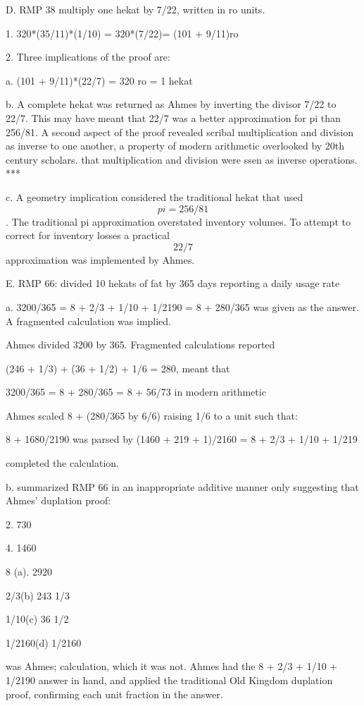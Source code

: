 \documentclass[12pt]{article}
\begin{document}
D. RMP 38 multiply one hekat by 7/22, written in ro units.

1. 320*(35/11)*(1/10) = 320*(7/22)= (101 + 9/11)ro

2. Three implications of the proof are:

a. (101 + 9/11)*(22/7) = 320 ro = 1 hekat

b. A complete hekat was returned as Ahmes by inverting the divisor 7/22 to 22/7. This may have meant that 22/7 was a better approximation for pi than 256/81. A second aspect of the proof revealed scribal multiplication and division as inverse to one another, a property of modern arithmetic overlooked by 20th century scholars.
that multiplication and division were ssen as inverse operations. ***

c. A geometry implication considered the traditional hekat that used $$pi = 256/81$$. The traditional pi approximation overstated inventory volumes. To attempt to correct for inventory losses a practical $$22/7$$ approximation was implemented by Ahmes.

E. RMP 66: divided 10 hekats of fat by 365 days reporting a daily usage rate

a. 3200/365 = 8 + 2/3 + 1/10 + 1/2190 = 8 + 280/365 was given as the answer. A fragmented calculation was implied.

Ahmes divided 3200 by 365. Fragmented calculations reported

(246 + 1/3) + (36  + 1/2) + 1/6 = 280, meant that

3200/365 = 8 +  280/365 = 8 + 56/73 in modern arithmetic

Ahmes scaled 8 + (280/365 by 6/6) raising 1/6 to a unit such that:

8 + 1680/2190 was parsed by (1460 + 219 + 1)/2160 = 8 + 2/3 + 1/10 + 1/219

completed the calculation.

b.  summarized RMP 66 in an inappropriate additive manner only suggesting that Ahmes' duplation proof: 

2.        730

4.        1460

8 (a).    2920

2/3(b)   243 1/3

1/10(c)   36 1/2 

1/2160(d)  1/2160

was Ahmes; calculation, which it was not. Ahmes had the 8 + 2/3 + 1/10 + 1/2190 answer in hand, and applied the traditional Old Kingdom duplation proof, confirming each unit fraction in the answer.
\end{document}
